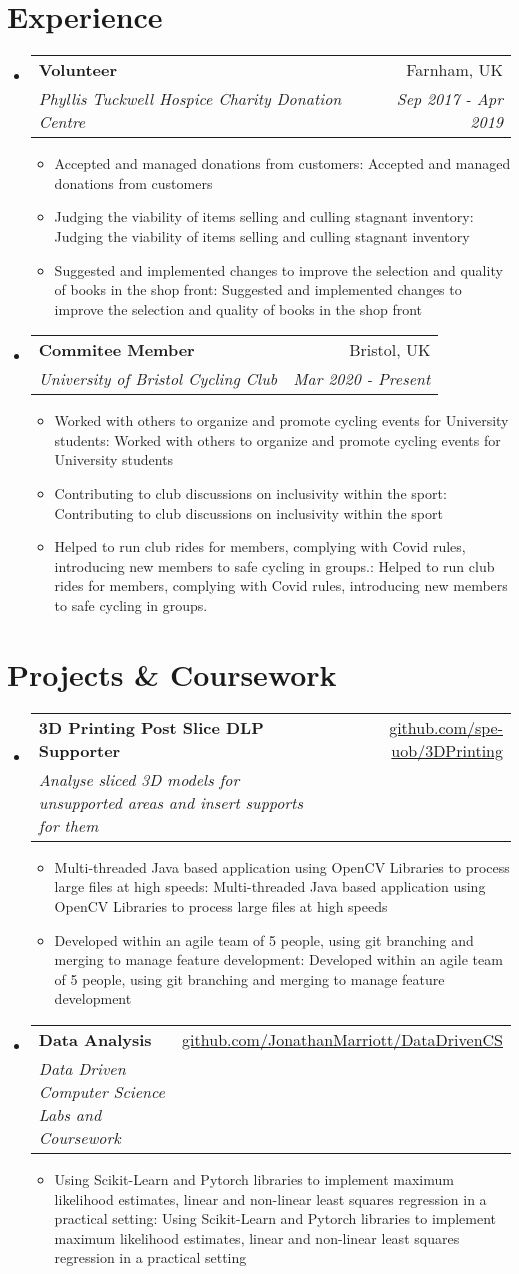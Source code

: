 \documentclass[a4paper,11pt]{article}
\makeatletter
\def \ifempty#1{\def\temp{#1} \ifx\temp\empty }
\newcommand{\resumeItem}[2]{
  \item\small{
  	\ifempty{#1}#2\else\textbf{#1}{: #2 \vspace{-2pt}}\fi
  }
}
\newcommand{\resumeSubheading}[4]{
  \vspace{-1pt}\item
    \begin{tabular*}{0.97\textwidth}{l@{\extracolsep{\fill}}r}
      \textbf{#1} & #2 \\
      \textit{\small#3} & \textit{\small #4} \\
    \end{tabular*}\vspace{-5pt}
}
\newcommand{\resumeSubHeadingListStart}{\begin{itemize}[leftmargin=*]}
\newcommand{\resumeSubHeadingListEnd}{\end{itemize}}
\newcommand{\resumeItemListStart}{\begin{itemize}}
\newcommand{\resumeItemListEnd}{\end{itemize}\vspace{-5pt}}
\makeatother
\begin{document}
\section{Experience}
  \resumeSubHeadingListStart
    \resumeSubheading
      {Volunteer}{Farnham, UK}
      {Phyllis Tuckwell Hospice Charity Donation Centre}{Sep 2017 - Apr 2019}
      \resumeItemListStart
      	\resumeItem{}
          {Accepted and managed donations from customers}
        \resumeItem{}
          {Judging the viability of items selling and culling stagnant inventory}
        \resumeItem{}
          {Suggested and implemented changes to improve the selection and quality of books in the shop front}
      \resumeItemListEnd
    \resumeSubheading
      {Commitee Member}{Bristol, UK}
      {University of Bristol Cycling Club}{Mar 2020 - Present}
      \resumeItemListStart
      	\resumeItem{}
          {Worked with others to organize and promote cycling events for University students}
        \resumeItem{}  
          {Contributing to club discussions on inclusivity within the sport}
	\resumeItem{}  
          {Helped to run club rides for members, complying with Covid rules, introducing new members to safe cycling in groups.}
      \resumeItemListEnd
  \resumeSubHeadingListEnd



\section{Projects \& Coursework}
  \resumeSubHeadingListStart
    \resumeSubheading
      {3D Printing Post Slice DLP Supporter}{\href{https://github.com/spe-uob/3DPrinting}
      {github.com/spe-uob/3DPrinting}}
      { Analyse sliced 3D models for unsupported areas and insert supports for them}{}
      \resumeItemListStart
        \resumeItem{}
          {Multi-threaded Java based application using OpenCV Libraries to process large files at high speeds}
	\resumeItem{}
	{Developed within an agile team of 5 people, using git branching and merging to manage feature development}
      \resumeItemListEnd
    \resumeSubheading
      {Data Analysis}{\href{https://github.com/JonathanMarriott/DataDrivenCS}{github.com/JonathanMarriott/DataDrivenCS}}
      {Data Driven Computer Science Labs and Coursework}{}
      \resumeItemListStart
        \resumeItem{}
          {Using Scikit-Learn and Pytorch libraries to implement maximum likelihood estimates, linear and non-linear least squares regression in a practical setting}
      \resumeItemListEnd
  \resumeSubHeadingListEnd
\end{document}
